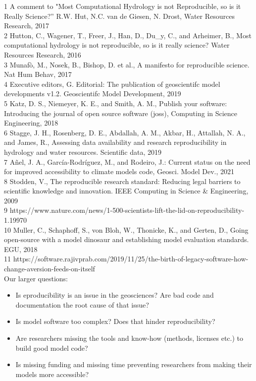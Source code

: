 \documentclass{article}
\begin{document}
1 A comment to "Most Computational Hydrology is not Reproducible, so is it Really Science?” R.W. Hut, N.C. van de Giesen, N. Drost, Water Resources Research, 2017\\
2 Hutton, C., Wagener, T., Freer, J., Han, D., Du\_y, C., and Arheimer, B., Most computational hydrology is not reproducible, so is it really science? Water Resources Research, 2016\\
3 Munafò, M., Nosek, B., Bishop, D. et al., A manifesto for reproducible science. Nat Hum Behav, 2017\\
4 Executive editors, G. Editorial: The publication of geoscientifc model developments v1.2. Geoscientifc Model Development, 2019\\
5 Katz, D. S., Niemeyer, K. E., and Smith, A. M., Publish your software: Introducing the journal of open source software (joss), Computing in Science Engineering, 2018\\
6 Stagge, J. H., Rosenberg, D. E., Abdallah, A. M., Akbar, H., Attallah, N. A., and James, R., Assessing data availability and research reproducibility in hydrology and water resources. Scientific data, 2019\\
7 Añel, J. A., García-Rodríguez, M., and Rodeiro, J.: Current status on the need for improved accessibility to climate models code, Geosci. Model Dev., 2021\\
8 Stodden, V., The reproducible research standard: Reducing legal barriers to scientific knowledge and innovation. IEEE Computing in Science \& Engineering, 2009\\
9 https://www.nature.com/news/1-500-scientists-lift-the-lid-on-reproducibility-1.19970\\
10 Muller, C., Schaphoff, S., von Bloh, W., Thonicke, K., and Gerten, D., Going open-source with a model dinosaur and establishing model evaluation standards. EGU, 2018\\
11 https://software.rajivprab.com/2019/11/25/the-birth-of-legacy-software-how-change-aversion-feeds-on-itself\\


Our larger questions:
\begin{itemize}
	\item Is eproducibility is an issue in the geosciences? Are bad code and documentation the root cause of that issue?
	\item Is model software too complex? Does that hinder reproducibility?
	\item Are researchers missing the tools and know-how (methods, licenses etc.) to build good model code?
	\item Is missing funding and missing time preventing researchers from making their models more accessible?
\end{itemize}
\end{document}
